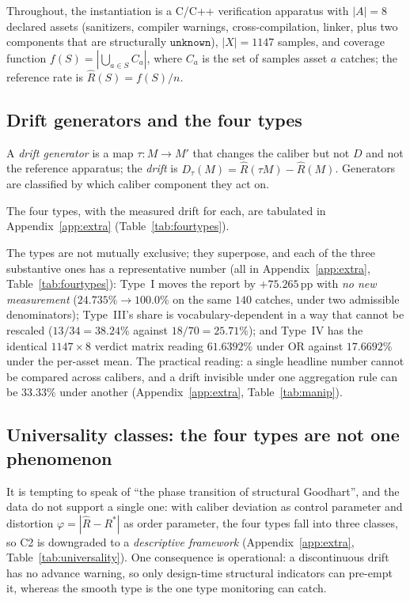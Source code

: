 \documentclass{article}
\newcommand{\Rhat}{\hat R}
\newcommand{\Rstar}{R^{*}}
\newcommand{\unk}{\texttt{unknown}}
\newcommand{\pp}{\,\mathrm{pp}}
\begin{document}
Throughout, the instantiation is a C/C++ verification apparatus with $|A|=8$ declared assets (sanitizers,
compiler warnings, cross-compilation, linker, plus two components that are structurally $\unk$),
$|X|=1147$ samples, and coverage function $f(S)=|\bigcup_{a\in S}C_a|$, where $C_a$ is the set of samples
asset $a$ catches; the reference rate is $\Rhat(S)=f(S)/n$.

\subsection{Drift generators and the four types}
\label{sec:fourtypes}

A \emph{drift generator} is a map $\tau:M\to M'$ that changes the caliber but not $D$ and not the reference
apparatus; the \emph{drift} is $D_\tau(M)=\Rhat(\tau M)-\Rhat(M)$. Generators are classified by which
caliber component they act on.


The four types, with the measured drift for each, are tabulated in Appendix~\ref{app:extra} (Table~\ref{tab:fourtypes}).


The types are not mutually exclusive; they superpose, and each of the three substantive ones has a
representative number (all in Appendix~\ref{app:extra}, Table~\ref{tab:fourtypes}): Type~I moves the report
by $+75.265\pp$ with \emph{no new measurement} ($24.735\%\to100.0\%$ on the same $140$ catches, under two
admissible denominators); Type~III's share is vocabulary-dependent in a way that cannot be rescaled
($13/34=38.24\%$ against $18/70=25.71\%$); and Type~IV has the identical $1147\times8$ verdict matrix
reading $61.6392\%$ under OR against $17.6692\%$ under the per-asset mean. The practical reading: a single
headline number cannot be compared across calibers, and a drift invisible under one aggregation rule can be
$33.33\%$ under another (Appendix~\ref{app:extra}, Table~\ref{tab:manip}).

\subsection{Universality classes: the four types are not one phenomenon}
\label{sec:universality}

It is tempting to speak of ``the phase transition of structural Goodhart'', and the data do not support a
single one: with caliber deviation as control parameter and distortion $\varphi=|\Rhat-\Rstar|$ as order
parameter, the four types fall into three classes, so C2 is downgraded to a \emph{descriptive framework}
(Appendix~\ref{app:extra}, Table~\ref{tab:universality}). One consequence is operational: a discontinuous
drift has no advance warning, so only design-time structural indicators can pre-empt it, whereas the smooth
type is the one type monitoring can catch.
\end{document}
